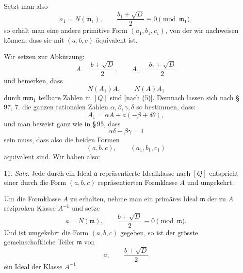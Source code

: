 \documentclass[11pt]{article}
\begin{document}
Setzt man also
\begin{equation}
 a_1=N(\mathfrak m_1),\qquad
 \frac{b_1+\sqrt D}{2}\equiv0\pmod{\mathfrak m_1},
\tag{5}
\end{equation}
so erhält man eine andere primitive Form $(a_1,b_1,c_1)$, von der wir nachweisen können, dass sie mit $(a,b,c)$ äquivalent ist.

Wir setzen zur Abkürzung:
\[
 A=\frac{b+\sqrt D}{2},\qquad
 A_1=\frac{b_1+\sqrt D}{2}
\]
und bemerken, dass
\[
 N(A_1)A,\qquad N(A)A_1
\]
durch $\mathfrak m\mathfrak m_1$ teilbare Zahlen in $[Q]$ sind [nach (5)]. Demnach lassen sich nach \S\,97, 7. die ganzen rationalen Zahlen $\alpha,\beta,\gamma,\delta$ so bestimmen, dass:
\begin{equation}
 A_1=\alpha A+a(-\beta+\delta\theta),
\tag{6}
\end{equation}
und man beweist ganz wie in \S\,95, dass
\[
 \alpha\delta-\beta\gamma=1
\]
sein muss, dass also die beiden Formen
\[
 (a,b,c),\qquad (a_1,b_1,c_1)
\]
äquivalent sind. Wir haben also:

11. \emph{Satz.} Jede durch ein Ideal $\mathfrak a$ repräsentierte Idealklasse nach $[Q]$ entspricht einer durch die Form $(a,b,c)$ repräsentierten Formklasse $A$ und umgekehrt.

Um die Formklasse $A$ zu erhalten, nehme man ein primäres Ideal $\mathfrak m$ der zu $A$ reziproken Klasse $A^{-1}$ und setze
\[
 a=N(\mathfrak m),\qquad
 \frac{b+\sqrt D}{2}\equiv0\pmod{\mathfrak m}.
\]
Und ist umgekehrt die Form $(a,b,c)$ gegeben, so ist der grösste gemeinschaftliche Teiler $\mathfrak m$ von
\[
 a,\qquad \frac{b+\sqrt D}{2}
\]
ein Ideal der Klasse $A^{-1}$.
\end{document}
